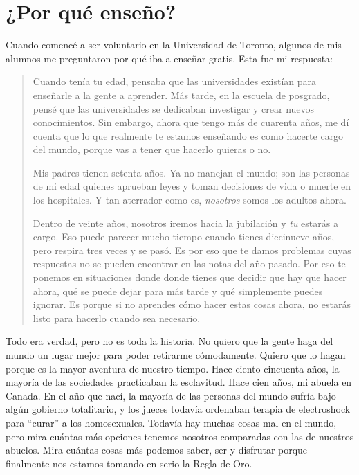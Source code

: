 \chapter{¿Por qué enseño?}\label{s:finale}

Cuando comencé a ser voluntario en la Universidad de Toronto,
algunos de mis alumnos me preguntaron por qué iba a enseñar gratis.
Esta fue mi respuesta:

\begin{quote}

Cuando tenía tu edad,
pensaba que las universidades existían para enseñarle a la gente a aprender.
Más tarde,
en la escuela de posgrado,
pensé que las universidades se dedicaban investigar y crear nuevos conocimientos.
Sin embargo, ahora que tengo más de cuarenta años, 
me dí cuenta que lo que realmente te estamos enseñando es 
como hacerte cargo del mundo,
porque vas a tener que hacerlo quieras o no.

Mis padres tienen setenta años.
Ya no manejan el mundo;
son las personas de mi edad quienes aprueban leyes
y toman decisiones de vida o muerte en los hospitales.
Y tan aterrador como es, 
\emph{nosotros} somos los adultos ahora.

Dentro de veinte años,
nosotros iremos hacia la jubilación y \emph{tu} estarás a cargo.
Eso puede parecer mucho tiempo cuando tienes diecinueve años,
pero respira tres veces y se pasó.
Es por eso que te damos problemas cuyas respuestas no se pueden encontrar en las notas del año pasado.
Por eso te ponemos en situaciones donde
donde tienes que decidir que hay que hacer ahora,
qué se puede dejar para más tarde
y qué simplemente puedes ignorar.
Es porque si no aprendes cómo hacer estas cosas ahora,
no estarás listo para hacerlo cuando sea necesario.

\end{quote}

Todo era verdad,
pero no es toda la historia.
No quiero que la gente haga del mundo un lugar mejor para poder retirarme cómodamente.
Quiero que lo hagan porque es la mayor aventura de nuestro tiempo.
Hace ciento cincuenta años,
la mayoría de las sociedades practicaban la esclavitud.
Hace cien años,
mi abuela  en Canada.
En el año que nací,
la mayoría de las personas del mundo sufría bajo algún gobierno totalitario,
y los jueces todavía ordenaban terapia de electroshock para ``curar'' a los homosexuales.
Todavía hay muchas cosas mal en el mundo,
pero mira cuántas más opciones tenemos nosotros comparadas con las de nuestros abuelos.
Mira cuántas cosas más podemos saber, ser y disfrutar
porque finalmente nos estamos tomando en serio la Regla de Oro.

